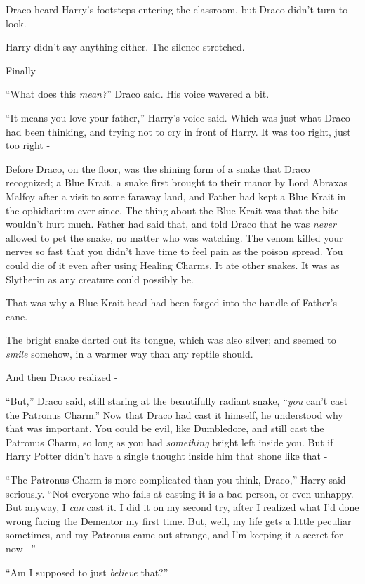 Draco heard Harry's footsteps entering the classroom, but Draco didn't turn to look.

Harry didn't say anything either. The silence stretched.

Finally -

``What does this \emph{mean?}'' Draco said. His voice wavered a bit.

``It means you love your father,'' Harry's voice said. Which was just what Draco had been thinking, and trying not to cry in front of Harry. It was too right, just too right -

Before Draco, on the floor, was the shining form of a snake that Draco recognized; a Blue Krait, a snake first brought to their manor by Lord Abraxas Malfoy after a visit to some faraway land, and Father had kept a Blue Krait in the ophidiarium ever since. The thing about the Blue Krait was that the bite wouldn't hurt much. Father had said that, and told Draco that he was \emph{never} allowed to pet the snake, no matter who was watching. The venom killed your nerves so fast that you didn't have time to feel pain as the poison spread. You could die of it even after using Healing Charms. It ate other snakes. It was as Slytherin as any creature could possibly be.

That was why a Blue Krait head had been forged into the handle of Father's cane.

The bright snake darted out its tongue, which was also silver; and seemed to \emph{smile} somehow, in a warmer way than any reptile should.

And then Draco realized -

``But,'' Draco said, still staring at the beautifully radiant snake, ``\emph{you} can't cast the Patronus Charm.'' Now that Draco had cast it himself, he understood why that was important. You could be evil, like Dumbledore, and still cast the Patronus Charm, so long as you had \emph{something} bright left inside you. But if Harry Potter didn't have a single thought inside him that shone like that -

``The Patronus Charm is more complicated than you think, Draco,'' Harry said seriously. ``Not everyone who fails at casting it is a bad person, or even unhappy. But anyway, I \emph{can} cast it. I did it on my second try, after I realized what I'd done wrong facing the Dementor my first time. But, well, my life gets a little peculiar sometimes, and my Patronus came out strange, and I'm keeping it a secret for now~-''

``Am I supposed to just \emph{believe} that?''

